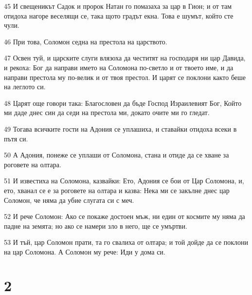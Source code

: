 \par 45 И свещеникът Садок и пророк Натан го помазаха за цар в Гион; и от там отидоха нагоре веселящи се, така щото градът екна. Това е шумът, който сте чули.
\par 46 При това, Соломон седна на престола на царството.
\par 47 Освен туй, и царските слуги влязоха да честитят на господаря ни цар Давида, и рекоха: Бог да направи името на Соломона по-светло и от твоето име, и да направи престола му по-велик и от твоя престол. И царят се поклони както беше на леглото си.
\par 48 Царят още говори така: Благословен да бъде Господ Израилевият Бог, Който ми даде днес син да седи на престола ми, докато очите ми го гледат.
\par 49 Тогава всичките гости на Адония се уплашиха, и ставайки отидоха всеки в пътя си.
\par 50 А Адония, понеже се уплаши от Соломона, стана и отиде да се хване за роговете на олтара.
\par 51 И известиха на Соломона, казвайки: Ето, Адония се бои от Цар Соломона, и, ето, хванал се е за роговете на олтара и казва: Нека ми се закълне днес цар Соломон, че няма да убие слугата си с меч.
\par 52 И рече Соломон: Ако се покаже достоен мъж, ни един от космите му няма да падне на земята; но ако се намери зло в него, ще се умъртви.
\par 53 И тъй, цар Соломон прати, та го свалиха от олтара; и той дойде да се поклони на цар Соломона. А Соломон му рече: Иди у дома си.

\chapter{2}

